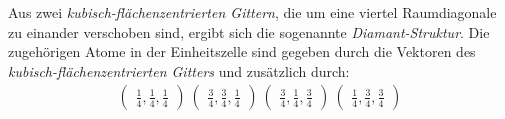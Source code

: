 Aus zwei \textit{kubisch-flächenzentrierten Gittern}, die
um eine viertel Raumdiagonale zu einander verschoben sind, ergibt sich die sogenannte
\textit{Diamant-Struktur}.
Die zugehörigen Atome in der Einheitszelle sind gegeben durch die
Vektoren des \textit{kubisch-flächenzentrierten Gitters}
und zusätzlich durch:
\begin{align}
\label{eqn:4*}
\begin{pmatrix}
\frac{1}{4}, \frac{1}{4}, \frac{1}{4}
\end{pmatrix}\
\begin{pmatrix}
\frac{3}{4}, \frac{3}{4}, \frac{1}{4}
\end{pmatrix}\
\begin{pmatrix}
\frac{3}{4}, \frac{1}{4}, \frac{3}{4}
\end{pmatrix}\
\begin{pmatrix}
\frac{1}{4}, \frac{3}{4}, \frac{3}{4}
\end{pmatrix}
\end{align}

